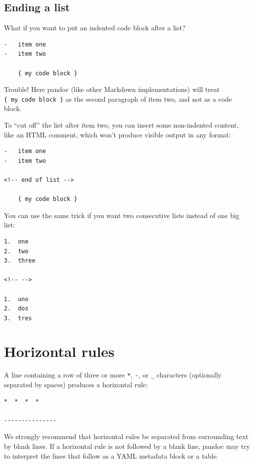 \documentclass[
  b5paper
]{book}
\begin{document}
\subsection{Ending a list}\label{ending-a-list}

What if you want to put an indented code block after a list?

\begin{verbatim}
-   item one
-   item two

    { my code block }
\end{verbatim}

Trouble! Here pandoc (like other Markdown implementations) will treat
\texttt{\{\ my\ code\ block\ \}} as the second paragraph of item two,
and not as a code block.

To ``cut off'' the list after item two, you can insert some non-indented
content, like an HTML comment, which won't produce visible output in any
format:

\begin{verbatim}
-   item one
-   item two

<!-- end of list -->

    { my code block }
\end{verbatim}

You can use the same trick if you want two consecutive lists instead of
one big list:

\begin{verbatim}
1.  one
2.  two
3.  three

<!-- -->

1.  uno
2.  dos
3.  tres
\end{verbatim}

\section{Horizontal rules}\label{horizontal-rules}

A line containing a row of three or more \texttt{*}, \texttt{-}, or
\texttt{\_} characters (optionally separated by spaces) produces a
horizontal rule:

\begin{verbatim}
*  *  *  *

---------------
\end{verbatim}

We strongly recommend that horizontal rules be separated from
surrounding text by blank lines. If a horizontal rule is not followed by
a blank line, pandoc may try to interpret the lines that follow as a
YAML metadata block or a table.
\end{document}
